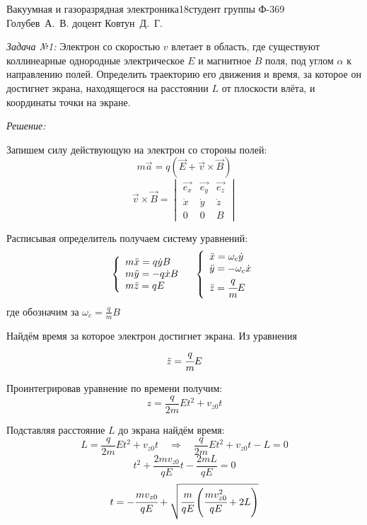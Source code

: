 




{Вакуумная и газоразрядная электроника}{}{18}{студент группы Ф-369\\Голубев~А.~В.}
{}{доцент Ковтун~Д.~Г.}{}{}

\emph{Задача №1:} Электрон со скоростью \( v \) влетает в область, где 
существуют коллинеарные однородные электрическое \( E \) и магнитное \( B \) 
поля, под углом \( \alpha \) к направлению полей. Определить траекторию 
его движения и время, за которое он достигнет экрана, находящегося на 
расстоянии \( L \) от плоскости влёта, и координаты точки на экране.

\emph{Решение:}

Запишем силу действующую на электрон со стороны полей:
\[
	m\vec{a} = q\left( \vec{E} + \vec{v}\times\vec{B} \right)
\]
\[
	\vec{v}\times\vec{B} = 
	\begin{vmatrix}
		\vec{e_x} & \vec{e_y} & \vec{e_z} \\
		\dot{x}   & \dot{y}   & \dot{z}   \\
		0         & 0         & B
	\end{vmatrix}
\]

Расписывая определитель получаем систему уравнений:
\[
	\left\{ \begin{array}{ll}
		m\ddot{x} = q\dot{y}B \\
		m\ddot{y} = -q\dot{x}B \\
		m\ddot{z} = qE
	\end{array} \right.
	\quad
	\left\{ \begin{array}{ll}
		\ddot{x} = \omega_c\dot{y} \\
		\ddot{y} = -\omega_c\dot{x} \\
		\ddot{z} = \cfrac{q}{m}E
	\end{array} \right.
\]
где обозначим за \( \omega_c = \frac{q}{m}B \)

Найдём время за которое электрон достигнет экрана. Из уравнения 
\[ \ddot{z} = \cfrac{q}{m}E \]

Проинтегрировав уравнение по времени получим:
\[
	z = \frac{q}{2m}Et^2 + v_{z0}t
\]

Подставляя расстояние \( L \) до экрана найдём время:
\[
	L = \frac{q}{2m}Et^2 + v_{z0}t \quad\Rightarrow\quad
	\frac{q}{2m}Et^2 + v_{z0}t - L = 0
\]
\[
	t^2 + \frac{2mv_{z0}}{qE}t - \frac{2mL}{qE} = 0
\]
\[
	t = -\cfrac{mv_{z0}}{qE} + 
	\sqrt{ \cfrac{m}{qE}\left( \cfrac{mv^2_{z0}}{qE} + 2L \right)}
\]

